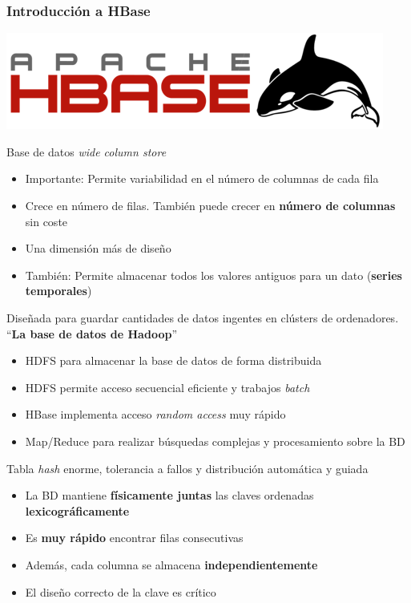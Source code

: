 \documentclass[14pt]{beamer}
\begin{document}
\begin{frame}[allowframebreaks]
\frametitle{Introducción a HBase}
\begin{center}
  \includegraphics[width=.5\textwidth]{img/hbase_logo}
\end{center}
Base de datos {\em wide column store}
\begin{itemize}
\item Importante: Permite variabilidad en el número de columnas de cada
  fila
\item Crece en número de filas. También puede crecer en {\bf número de
    columnas} sin coste
\item Una dimensión más de diseño
\item También: Permite almacenar todos los valores antiguos para un dato
  ({\bf series temporales})
\end{itemize}

\framebreak

Diseñada para guardar cantidades de datos ingentes en clústers de
ordenadores. ``{\bf La base de datos de Hadoop}''
  \begin{itemize}
  \item HDFS para almacenar la base de datos de forma distribuida
  \item HDFS permite acceso secuencial eficiente y trabajos
    {\em batch\/}
  \item HBase implementa acceso {\em random access} muy rápido
  \item Map/Reduce para realizar búsquedas complejas y procesamiento sobre
    la BD
  \end{itemize}

\framebreak

 Tabla {\em hash\/} enorme, tolerancia a fallos y distribución
  automática y guiada
  \begin{itemize}
  \item La BD mantiene {\bf físicamente juntas} las claves ordenadas {\bf
      lexicográficamente}
  \item Es {\bf muy rápido} encontrar filas consecutivas
  \item Además, cada columna se almacena {\bf independientemente}
  \item El diseño correcto de la clave es {\color{red} crítico}
  \end{itemize}


\end{frame}
\end{document}
